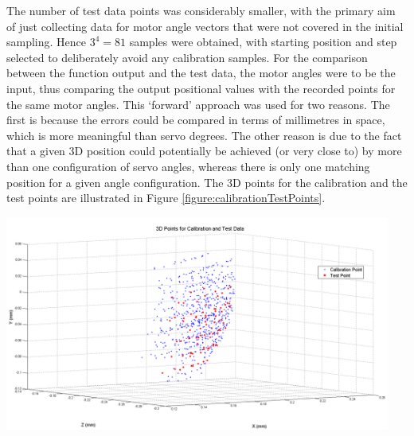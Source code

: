\documentclass[11pt]{article}
\begin{document}
The number of test data points was considerably smaller, with the primary aim of just collecting data for motor angle vectors that were not covered in the initial sampling. Hence $3^4 = 81$ samples were obtained, with starting position and step selected to deliberately avoid any calibration samples. For the comparison between the function output and the test data, the motor angles were to be the input, thus comparing the output positional values with the recorded points for the same motor angles. This `forward' approach was used for two reasons. The first is because the errors could be compared in terms of millimetres in space, which is more meaningful than servo degrees. The other reason is due to the fact that a given 3D position could potentially be achieved (or very close to) by more than one configuration of servo angles, whereas there is only one matching position for a given angle configuration. The 3D points for the calibration and the test points are illustrated in Figure \ref{figure:calibrationTestPoints}. 


\begin{center}
\includegraphics[width=0.95\textwidth]{images/calibrationTestPoints.png}
\label{figure:calibrationTestPoints}
\end{center}
\end{document}
